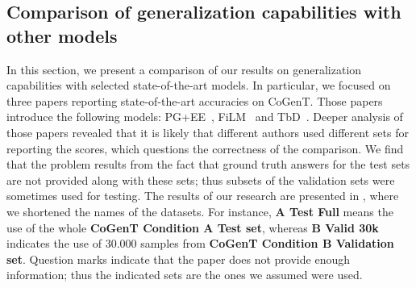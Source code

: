 \subsection{Comparison of generalization capabilities with other models}
\label{sec:comparison}

In this section, we present a comparison of our results on generalization capabilities with selected state-of-the-art models.
In particular, we focused on three papers reporting state-of-the-art accuracies on CoGenT. Those papers introduce the following models: PG+EE~\cite{johnson2017inferring}, FiLM~\cite{perez2017film} and TbD~\cite{mascharka2018transparency}.
Deeper analysis of those papers revealed that it is likely that different authors used different sets for reporting the scores, which questions the correctness of the comparison.
We find that the problem results from the fact that ground truth answers for the test sets are not provided along with these sets; thus subsets of the validation sets were sometimes used for testing. 
The results of our research are presented in , where we shortened the names of the datasets.
For instance, \textbf{A Test Full} means the use of the whole \textbf{CoGenT Condition A Test set}, whereas \textbf{B Valid 30k} indicates the use of 30.000 samples from \textbf{CoGenT Condition B Validation set}.
Question marks indicate that the paper does not provide enough information; thus the indicated sets are the ones we assumed were used.

